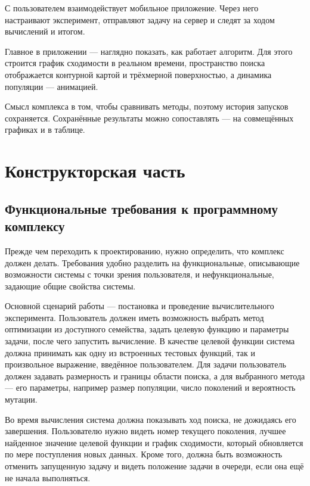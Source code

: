 \documentclass[14pt, a4paper]{extarticle}
\begin{document}
С пользователем взаимодействует мобильное приложение. Через него настраивают
эксперимент, отправляют задачу на сервер и следят за ходом вычислений и итогом.

Главное в приложении --- наглядно показать, как работает алгоритм. Для этого
строится график сходимости в реальном времени, пространство поиска отображается
контурной картой и трёхмерной поверхностью, а динамика популяции --- анимацией.

Смысл комплекса в том, чтобы сравнивать методы, поэтому история запусков
сохраняется. Сохранённые результаты можно сопоставлять --- на совмещённых
графиках и в таблице.

\section{Конструкторская часть}\label{sec:design}

\subsection{Функциональные требования к программному комплексу}
\label{subsec:requirements}

Прежде чем переходить к проектированию, нужно определить, что комплекс должен
делать. Требования удобно разделить на функциональные, описывающие возможности
системы с точки зрения пользователя, и нефункциональные, задающие общие свойства
системы.

Основной сценарий работы --- постановка и проведение вычислительного эксперимента.
Пользователь должен иметь возможность выбрать метод оптимизации из доступного
семейства, задать целевую функцию и параметры задачи, после чего запустить
вычисление. В качестве целевой функции система должна принимать как одну из
встроенных тестовых функций, так и произвольное выражение, введённое
пользователем. Для задачи пользователь должен задавать размерность и границы
области поиска, а для выбранного метода --- его параметры, например размер
популяции, число поколений и вероятность мутации.

Во время вычисления система должна показывать ход поиска, не дожидаясь его
завершения. Пользователю нужно видеть номер текущего поколения, лучшее найденное
значение целевой функции и график сходимости, который обновляется по мере
поступления новых данных. Кроме того, должна быть возможность отменить запущенную
задачу и видеть положение задачи в очереди, если она ещё не начала выполняться.
\end{document}
